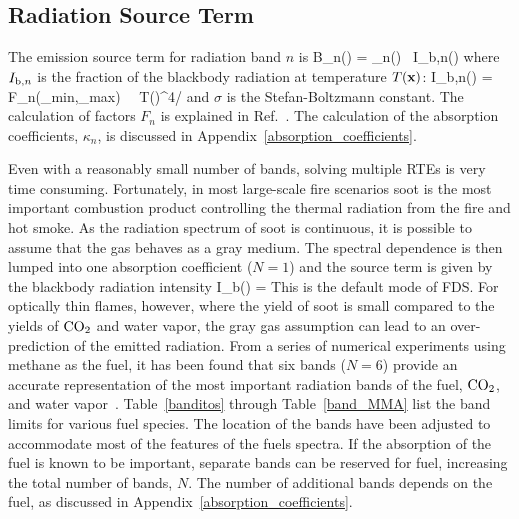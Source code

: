 \subsection{Radiation Source Term}

The emission source term for radiation band $n$ is
\be
   B_n(\bx) = \kappa_n(\bx) \, I_{{\rm b},n}(\bx)
\ee
where $I_{{\rm b},n}$ is the fraction of the blackbody radiation at temperature $T({\mathbf{x}})$:
\be
   I_{{\rm b},n}(\bx) = F_n(\la_{\rm min},\la_{\rm max}) \, \sigma \, T(\bx)^4/\pi
\ee
and $\sigma$ is the Stefan-Boltzmann constant. The calculation of factors $F_n$ is explained in Ref.~\cite{Siegel:1}. The calculation of the absorption coefficients, $\kappa_n$, is discussed in Appendix~\ref{absorption_coefficients}.

Even with a reasonably small number of bands, solving multiple RTEs is very time consuming. Fortunately, in most large-scale fire scenarios soot is the most important combustion product controlling the thermal radiation from the fire and hot smoke. As the radiation spectrum of soot is continuous, it is possible to assume that the gas behaves as a gray medium.  The spectral dependence is then lumped into one absorption coefficient ($N=1$) and the source term is given by the blackbody radiation intensity \cite{Ludwig:NASA}
\be
   I_{\rm b}(\bx) =  \label{emission_source_term}
\ee
This is the default mode of FDS. For optically thin flames, however, where the yield of soot is small compared to the yields of $\rm CO_2$ and water vapor, the gray gas assumption can lead to an over-prediction of the emitted radiation. From a series of numerical experiments using methane as the fuel, it has been found that six bands ($N=6$) provide an accurate representation of the most important radiation bands of the fuel, $\rm CO_2$, and water vapor~\cite{Hostikka:3}. Table~\ref{banditos} through Table~\ref{band_MMA} list the band limits for various fuel species. The location of the bands have been adjusted to accommodate most of the features of the fuels spectra. If the absorption of the fuel is known to be important, separate bands can be reserved for fuel, increasing the total number of bands, $N$. The number of additional bands depends on the fuel, as discussed in Appendix~\ref{absorption_coefficients}.

